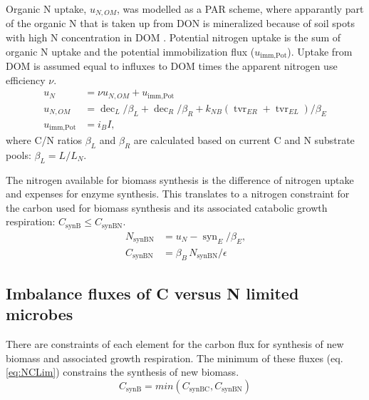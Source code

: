 Organic N uptake, $u_{N,OM}$, was modelled as a PAR scheme, where apparantly
part of the organic N  that is taken up from DON is mineralized because of soil
spots with high N concentration in DOM \citep{Manzoni08}. Potential nitrogen
uptake is the sum of organic N uptake and the potential immobilization
flux ($u_{\operatorname{imm,Pot}}$). Uptake from DOM is assumed equal to
influxes to DOM times the apparent nitrogen use efficiency $\nu$.
\begin{subequations}
\label{eq:uN}
\begin{align}
u_N &= \nu u_{N,OM} + u_{\operatorname{imm,Pot}}
\\
u_{N,OM} &= \operatorname{dec}_L/\beta_L + \operatorname{dec}_R/\beta_R +
k_{NB} (\operatorname{tvr}_{ER} + \operatorname{tvr}_{EL})/\beta_E
\\
u_{\operatorname{imm,Pot}} &= i_B I 
\text{,}
\end{align}
\end{subequations}
where C/N ratios $\beta_L$ and $\beta_R$ are calculated based on current C
and N substrate pools: $\beta_L = L/L_N$.  

The nitrogen available for biomass synthesis is the difference of nitrogen
uptake and expenses for enzyme synthesis. This translates to a nitrogen
constraint for the carbon used for biomass synthesis and its associated
catabolic growth respiration: $C_{\operatorname{synB}} \le
C_{\operatorname{synBN}}$.
\begin{subequations}
\label{eq:synBN}
\begin{align}
N_{\operatorname{synBN}} &= u_N - \operatorname{syn}_E/\beta_E \text{,} \\
C_{\operatorname{synBN}} &= \beta_B \, N_{\operatorname{synBN}}  / \epsilon
\end{align}
\end{subequations}


\subsection{Imbalance fluxes of C versus N limited microbes }
There are constraints of each element for the carbon flux for synthesis of new
biomass and associated growth respiration. The minimum of these fluxes (eq.
\ref{eq:NCLim}) constrains the synthesis of new biomass. 
\begin{equation}
\label{eq:NCLim} 
C_{\operatorname{synB}} =
min(C_{\operatorname{synBC}}, C_{\operatorname{synBN}} )
\end{equation}

